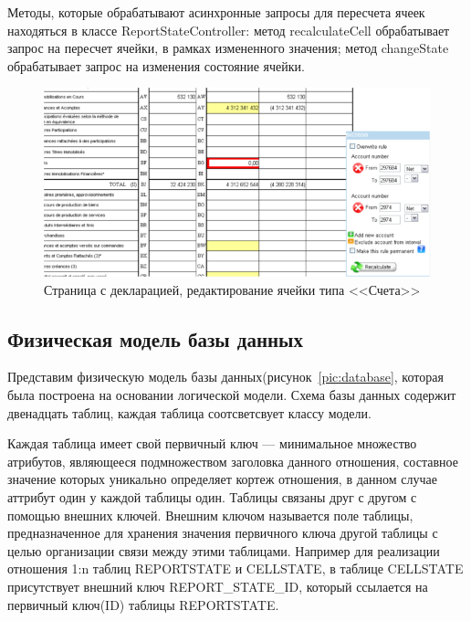 \documentclass[14pt,a4paper]{reportmod}
\begin{document}
Методы, которые обрабатывают асинхронные запросы для пересчета ячеек находяться в классе ReportStateController: метод recalculateCell обрабатывает запрос на пересчет ячейки, в рамках измененного значения; метод changeState обрабатывает запрос на изменения состояние ячейки.


\begin{figure}
  \centering
  \includegraphics[scale=0.7]{pics/scr_report_rules}
  \caption{Страница с декларацией, редактирование ячейки типа <<Счета>>}
  \label{pic:report_scr}
\end{figure}

\subsection{Физическая модель базы данных}
Представим физическую модель базы данных(рисунок~\ref{pic:database}, которая была построена на основании логической модели. Схема базы данных содержит двенадцать таблиц, каждая таблица соотсветсвует классу модели.


Каждая таблица имеет свой первичный ключ --- минимальное множество атрибутов, являющееся подмножеством заголовка данного отношения, составное значение которых уникально определяет кортеж отношения, в данном случае аттрибут один у каждой таблицы один. Таблицы связаны друг с другом с помощью внешних ключей. Внешним ключом называется поле таблицы, предназначенное для хранения значения первичного ключа другой таблицы с целью организации связи между этими таблицами. Например для реализации отношения 1:n таблиц REPORTSTATE и CELLSTATE, в таблице CELLSTATE присутствует внешний ключ REPORT\_STATE\_ID, который ссылается на первичный ключ(ID) таблицы REPORTSTATE.
\end{document}
